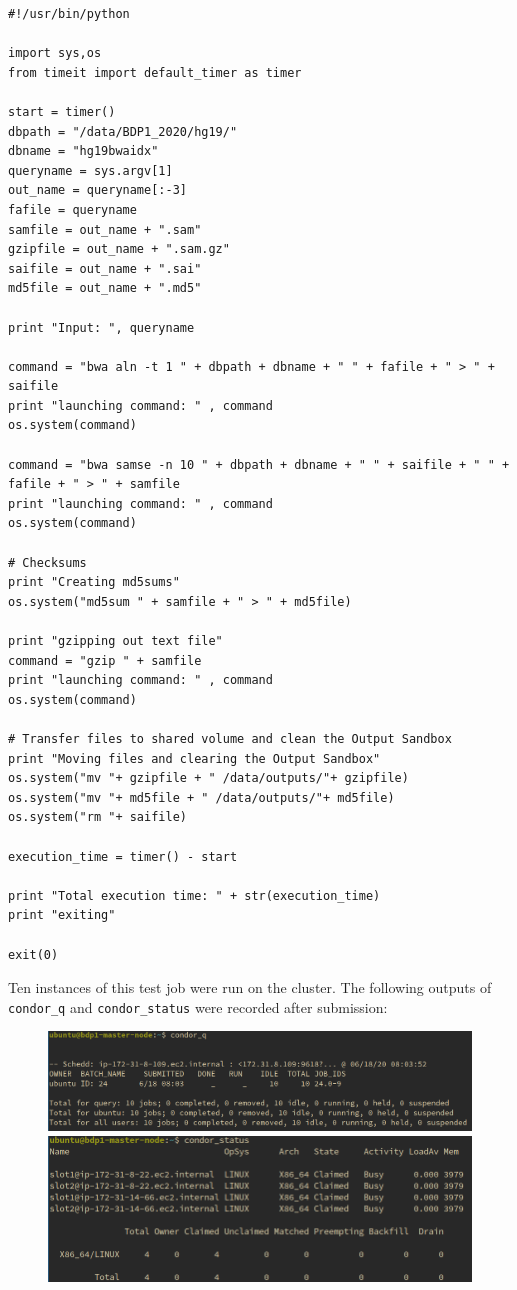 \documentclass{article}
\begin{document}
\begin{lstlisting}
#!/usr/bin/python

import sys,os
from timeit import default_timer as timer

start = timer()
dbpath = "/data/BDP1_2020/hg19/"
dbname = "hg19bwaidx"
queryname = sys.argv[1]
out_name = queryname[:-3]
fafile = queryname
samfile = out_name + ".sam"
gzipfile = out_name + ".sam.gz"
saifile = out_name + ".sai"
md5file = out_name + ".md5"

print "Input: ", queryname

command = "bwa aln -t 1 " + dbpath + dbname + " " + fafile + " > " + saifile
print "launching command: " , command
os.system(command)

command = "bwa samse -n 10 " + dbpath + dbname + " " + saifile + " " + fafile + " > " + samfile
print "launching command: " , command
os.system(command)

# Checksums
print "Creating md5sums"
os.system("md5sum " + samfile + " > " + md5file)

print "gzipping out text file"
command = "gzip " + samfile
print "launching command: " , command
os.system(command)

# Transfer files to shared volume and clean the Output Sandbox
print "Moving files and clearing the Output Sandbox"
os.system("mv "+ gzipfile + " /data/outputs/"+ gzipfile)
os.system("mv "+ md5file + " /data/outputs/"+ md5file)
os.system("rm "+ saifile)

execution_time = timer() - start

print "Total execution time: " + str(execution_time)
print "exiting"

exit(0)
\end{lstlisting}

Ten instances of this test job were run on the cluster.
The following outputs of \texttt{condor\_q} and \texttt{condor\_status} were recorded after submission:

\begin{figure}[!h]
    \center
    \includegraphics[width=\textwidth]{./images/condor_q.png}
    \includegraphics[width=\textwidth]{./images/condor_status_busy.png}
\end{figure}
\FloatBarrier
\end{document}
